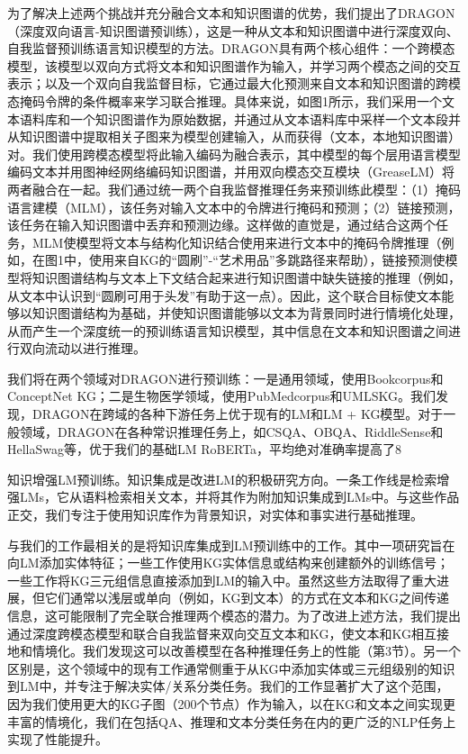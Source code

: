 为了解决上述两个挑战并充分融合文本和知识图谱的优势，我们提出了DRAGON（深度双向语言-知识图谱预训练），这是一种从文本和知识图谱中进行深度双向、自我监督预训练语言知识模型的方法。DRAGON具有两个核心组件：一个跨模态模型，该模型以双向方式将文本和知识图谱作为输入，并学习两个模态之间的交互表示；以及一个双向自我监督目标，它通过最大化预测来自文本和知识图谱的跨模态掩码令牌的条件概率来学习联合推理。具体来说，如图1所示，我们采用一个文本语料库和一个知识图谱作为原始数据，并通过从文本语料库中采样一个文本段并从知识图谱中提取相关子图来为模型创建输入，从而获得（文本，本地知识图谱）对。我们使用跨模态模型将此输入编码为融合表示，其中模型的每个层用语言模型编码文本并用图神经网络编码知识图谱，并用双向模态交互模块（GreaseLM）将两者融合在一起。我们通过统一两个自我监督推理任务来预训练此模型：（1）掩码语言建模（MLM），该任务对输入文本中的令牌进行掩码和预测；（2）链接预测，该任务在输入知识图谱中丢弃和预测边缘。这样做的直觉是，通过结合这两个任务，MLM使模型将文本与结构化知识结合使用来进行文本中的掩码令牌推理（例如，在图1中，使用来自KG的“圆刷”-“艺术用品”多跳路径来帮助），链接预测使模型将知识图谱结构与文本上下文结合起来进行知识图谱中缺失链接的推理（例如，从文本中认识到“圆刷可用于头发”有助于这一点）。因此，这个联合目标使文本能够以知识图谱结构为基础，并使知识图谱能够以文本为背景同时进行情境化处理，从而产生一个深度统一的预训练语言知识模型，其中信息在文本和知识图谱之间进行双向流动以进行推理。

我们将在两个领域对DRAGON进行预训练：一是通用领域，使用Bookcorpus和ConceptNet KG；二是生物医学领域，使用PubMedcorpus和UMLSKG。我们发现，DRAGON在跨域的各种下游任务上优于现有的LM和LM + KG模型。对于一般领域，DRAGON在各种常识推理任务上，如CSQA、OBQA、RiddleSense和HellaSwag等，优于我们的基础LM RoBERTa，平均绝对准确率提高了8%

知识增强LM预训练。知识集成是改进LM的积极研究方向。一条工作线是检索增强LMs，它从语料检索相关文本，并将其作为附加知识集成到LMs中。与这些作品正交，我们专注于使用知识库作为背景知识，对实体和事实进行基础推理。

与我们的工作最相关的是将知识库集成到LM预训练中的工作。其中一项研究旨在向LM添加实体特征；一些工作使用KG实体信息或结构来创建额外的训练信号；一些工作将KG三元组信息直接添加到LM的输入中。虽然这些方法取得了重大进展，但它们通常以浅层或单向（例如，KG到文本）的方式在文本和KG之间传递信息，这可能限制了完全联合推理两个模态的潜力。为了改进上述方法，我们提出通过深度跨模态模型和联合自我监督来双向交互文本和KG，使文本和KG相互接地和情境化。我们发现这可以改善模型在各种推理任务上的性能（第3节）。另一个区别是，这个领域中的现有工作通常侧重于从KG中添加实体或三元组级别的知识到LM中，并专注于解决实体/关系分类任务。我们的工作显著扩大了这个范围，因为我们使用更大的KG子图（200个节点）作为输入，以在KG和文本之间实现更丰富的情境化，我们在包括QA、推理和文本分类任务在内的更广泛的NLP任务上实现了性能提升。

